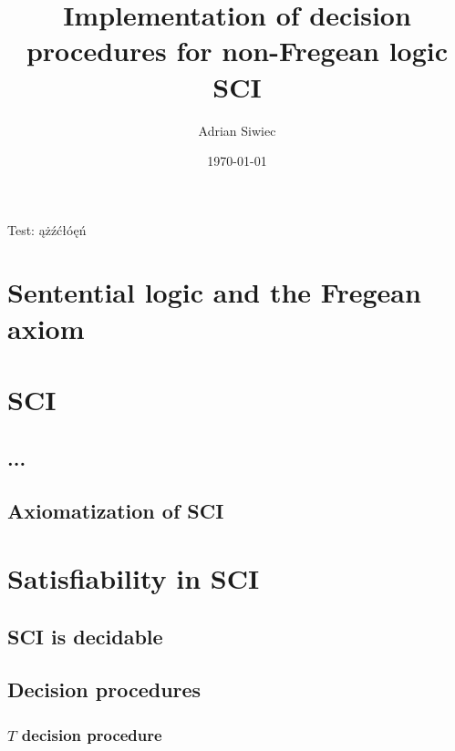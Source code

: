 \documentclass{article}
\title{Implementation of decision procedures for non-Fregean logic SCI}
\author{Adrian Siwiec}
\theoremstyle{definition}
\begin{document}
\date{\today}

\maketitle

Test: ążźćłóęń

\section{Sentential logic and the Fregean axiom}
\section{SCI}
\subsection{...}
\subsection{Axiomatization of SCI}
\section{Satisfiability in SCI}
\subsection{SCI is decidable}
\subsection{Decision procedures}
\subsubsection{$T$ decision procedure}
\end{document}
